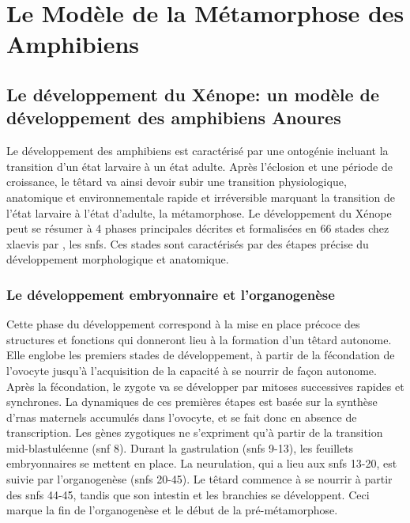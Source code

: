 \documentclass[../main.tex]{subfiles}
\begin{document}
\chapter{Le Modèle de la Métamorphose des Amphibiens}\label{chap:metamorphosis}




\section{Le développement du Xénope: un modèle de développement des amphibiens Anoures}

Le développement des amphibiens est caractérisé par une ontogénie incluant la transition d'un état larvaire à un état adulte.
Après l'éclosion et une période de croissance, le têtard va ainsi devoir subir une transition physiologique, anatomique et environnementale rapide et irréversible marquant la transition de l'état larvaire à l'état d'adulte, la métamorphose.
Le développement du Xénope peut se résumer à 4 phases principales décrites et formalisées en 66 stades chez \gls{xlaevis} par \citet{Nieukoop1956}, les \glspl{snf}.
Ces stades sont caractérisés par des étapes précise du développement morphologique et anatomique.

\subsection{Le développement embryonnaire et l'organogenèse}
Cette phase du développement correspond à la mise en place précoce des structures et fonctions qui donneront lieu à la formation d'un têtard autonome.
Elle englobe les premiers stades de développement, à partir de la fécondation de l'ovocyte jusqu'à l'acquisition de la capacité à se nourrir de façon autonome.
Après la fécondation, le zygote va se développer par mitoses successives rapides et synchrones.
La dynamiques de ces premières étapes est basée sur la synthèse d'\glspl{rna} maternels accumulés dans l'ovocyte, et se fait donc en absence de transcription.
Les gènes zygotiques ne s'expriment qu'à partir de la transition mid-blastuléenne (\gls{snf} 8).
Durant la gastrulation (\glspl{snf} 9-13), les feuillets embryonnaires se mettent en place.
La neurulation, qui a lieu aux \glspl{snf} 13-20, est suivie par l'organogenèse (\glspl{snf} 20-45).
Le têtard commence à se nourrir à partir des \glspl{snf} 44-45, tandis que son intestin et les branchies se développent.
Ceci marque la fin de l'organogenèse et le début de la pré-métamorphose.
\end{document}
